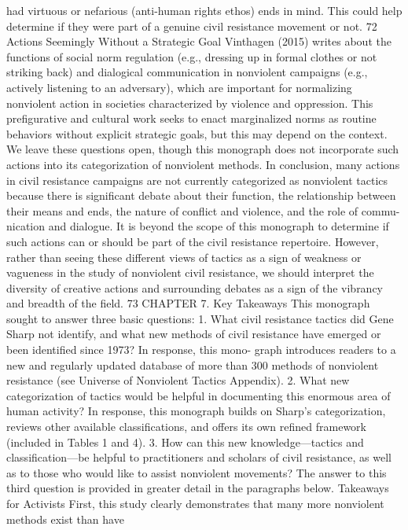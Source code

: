 \documentclass[twoside,a4paper,12pt,fleqn,openany]{extbook}
\begin{document}
had virtuous or nefarious (anti-human rights ethos) ends in mind. This could help determine
if they were part of a genuine civil resistance movement or not.
72
Actions Seemingly Without a Strategic Goal
Vinthagen (2015) writes about the functions of social norm regulation (e.g., dressing up in
formal clothes or not striking back) and dialogical communication in nonviolent campaigns
(e.g., actively listening to an adversary), which are important for normalizing nonviolent action
in societies characterized by violence and oppression. This prefigurative and cultural work
seeks to enact marginalized norms as routine behaviors without explicit strategic goals, but
this may depend on the context. We leave these questions open, though this monograph
does not incorporate such actions into its categorization of nonviolent methods.
In conclusion, many actions in civil resistance campaigns are not currently categorized
as nonviolent tactics because there is significant debate about their function, the relationship
between their means and ends, the nature of conflict and violence, and the role of commu-
nication and dialogue. It is beyond the scope of this monograph to determine if such actions
can or should be part of the civil resistance repertoire. However, rather than seeing these
different views of tactics as a sign of weakness or vagueness in the study of nonviolent civil
resistance, we should interpret the diversity of creative actions and surrounding debates as
a sign of the vibrancy and breadth of the field.
73
CHAPTER 7. Key Takeaways
This monograph sought to answer three basic questions:
1.	What civil resistance tactics did Gene Sharp not identify, and what new methods of
civil resistance have emerged or been identified since 1973? In response, this mono-
graph introduces readers to a new and regularly updated database of more than 300
methods of nonviolent resistance (see Universe of Nonviolent Tactics Appendix).
2.	 What new categorization of tactics would be helpful in documenting this enormous
area of human activity? In response, this monograph builds on Sharp’s categorization,
reviews other available classifications, and offers its own refined framework (included
in Tables 1 and 4).
3.	 How can this new knowledge—tactics and classification—be helpful to practitioners
and scholars of civil resistance, as well as to those who would like to assist nonviolent
movements? The answer to this third question is provided in greater detail in the
paragraphs below.
Takeaways for Activists
First, this study clearly demonstrates that many more nonviolent methods exist than have
\end{document}
